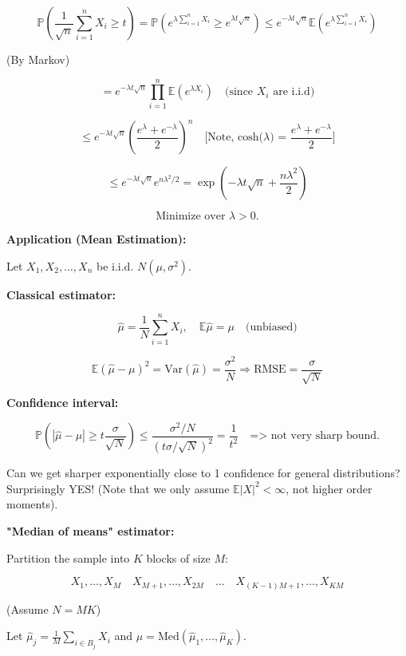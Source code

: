 \documentclass[12pt]{article}
\begin{document}
\[
\mathbb{P}\left(\frac{1}{\sqrt{n}} \sum_{i=1}^{n} X_i \geq t\right) = \mathbb{P}\left(e^{\lambda \sum_{i=1}^{n} X_i} \geq e^{\lambda t \sqrt{n}}\right) \leq e^{-\lambda t \sqrt{n}} \mathbb{E}\left(e^{\lambda \sum_{i=1}^{n} X_i}\right)
\]

(By Markov)

\[
= e^{-\lambda t \sqrt{n}} \prod_{i=1}^{n} \mathbb{E}\left(e^{\lambda X_i}\right) \quad \text{(since \(X_i\) are i.i.d)}
\]

\[
\leq e^{-\lambda t \sqrt{n}} \left(\frac{e^{\lambda} + e^{-\lambda}}{2}\right)^n \quad \text{[Note, cosh(\(\lambda\)) = \(\frac{e^{\lambda} + e^{-\lambda}}{2}\)]}
\]

\[
\leq e^{-\lambda t \sqrt{n}} e^{n\lambda^2/2} = \exp\left(-\lambda t \sqrt{n} + \frac{n \lambda^2}{2}\right)
\]

\[ 
\text{Minimize over } \lambda > 0.
\]

\textbf{Application (Mean Estimation):}

Let \( X_1, X_2, \dots, X_n \) be \( \text{i.i.d. } N(\mu, \sigma^2) \).

\textbf{Classical estimator:}

\[
\hat{\mu} = \frac{1}{N} \sum_{i=1}^{n} X_i, \quad \mathbb{E} \hat{\mu} = \mu \quad \text{(unbiased)}
\]

\[
\mathbb{E}\left(\hat{\mu} - \mu\right)^2 = \text{Var}(\hat{\mu}) = \frac{\sigma^2}{N} \Rightarrow \text{RMSE} = \frac{\sigma}{\sqrt{N}}
\]

\textbf{Confidence interval:}

\[
\mathbb{P}\left(|\hat{\mu} - \mu| \geq t \frac{\sigma}{\sqrt{N}}\right) \leq \frac{\sigma^2/N}{(t \sigma/\sqrt{N})^2} = \frac{1}{t^2} \quad \text{=> not very sharp bound.}
\]

Can we get sharper exponentially close to 1 confidence for general distributions? Surprisingly YES! (Note that we only assume \( \mathbb{E}|X|^2 < \infty \), not higher order moments).

\textbf{"Median of means" estimator:}

Partition the sample into \( K \) blocks of size \( M \):

\[
X_1, \dots, X_M \quad X_{M+1}, \dots, X_{2M} \quad \dots \quad X_{(K-1)M+1}, \dots, X_{KM}
\]

(Assume \( N = MK \))

Let \( \hat{\mu}_j = \frac{1}{M} \sum_{i \in B_j} X_i \) and \( \hat{\mu} = \text{Med}(\hat{\mu}_1, \dots, \hat{\mu}_K) \).
\end{document}
